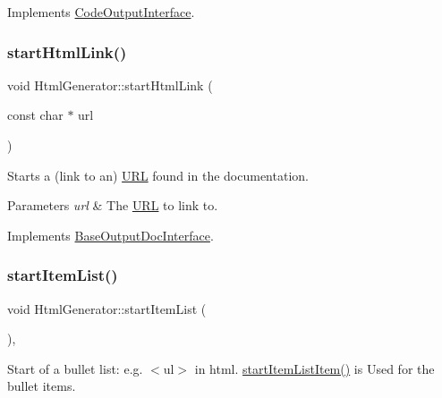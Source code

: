 Implements \mbox{\hyperlink{class_code_output_interface_ac90f75968cdcf127e0b02938bdb49d87}{Code\+Output\+Interface}}.

\mbox{\label{class_html_generator_a5fdd7ff7fcabd4e301b8fec2b9c72b85}} 
\subsubsection{\texorpdfstring{startHtmlLink()}{startHtmlLink()}}
{\footnotesize\ttfamily void Html\+Generator\+::start\+Html\+Link (\begin{DoxyParamCaption}\item[{const char $\ast$}]{url }\end{DoxyParamCaption})\hspace{0.3cm}{\ttfamily [virtual]}}

Starts a (link to an) \mbox{\hyperlink{struct_u_r_l}{U\+RL}} found in the documentation. 
\begin{DoxyParams}{Parameters}
{\em url} & The \mbox{\hyperlink{struct_u_r_l}{U\+RL}} to link to. \\
\hline
\end{DoxyParams}


Implements \mbox{\hyperlink{class_base_output_doc_interface_ab52dbf41ce337c701f9cd1e7794f80e7}{Base\+Output\+Doc\+Interface}}.

\mbox{\label{class_html_generator_aedec2c1429139e4fd713df22e5636879}} 
\subsubsection{\texorpdfstring{startItemList()}{startItemList()}}
{\footnotesize\ttfamily void Html\+Generator\+::start\+Item\+List (\begin{DoxyParamCaption}{ }\end{DoxyParamCaption})\hspace{0.3cm}{\ttfamily [inline]}, {\ttfamily [virtual]}}

Start of a bullet list\+: e.\+g. {\ttfamily $<$ul$>$} in html. \mbox{\hyperlink{class_html_generator_aaa5091e04c77ea310e0c5dee4cc04e94}{start\+Item\+List\+Item()}} is Used for the bullet items. 

